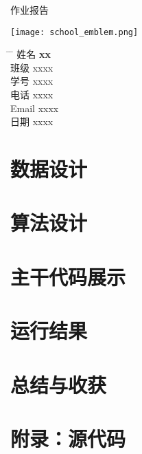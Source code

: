 \documentclass[UTF8]{ctexart}
\begin{document}
\begin{titlepage}
    \begin{center}
        \Huge{作业报告}
        \noindent{\color{BrickRed} \rule{\linewidth}{1mm}}
        \Huge
        \vspace{0.5cm}
		\LARGE
		\vspace{1.5cm}
		\textbf{}

        \texttt{[image: school\_emblem.png]}

        \vspace{1.5cm}
    \end{center}
    \Large
    \begin{tabbing}
        \hspace*{1em}\= \hspace*{8em} \= \kill %
        \> 姓名 \>  \textbf{xx} \\
        \> 班级 \>  xxxx \\
        \> 学号 \>  xxxx  \\
        \> 电话  \> xxxx \\
        \> Email \> xxxx \\
        \> 日期 \>  xxxx
    \end{tabbing}
    
\end{titlepage}
\setlength{\headheight}{21.89642pt}
\tableofcontents
\newpage{}
\section{数据设计}
\section{算法设计}
\section{主干代码展示}
\section{运行结果}
\section{总结与收获}
\newpage
\appendix
\section{附录：源代码}
\end{document}
